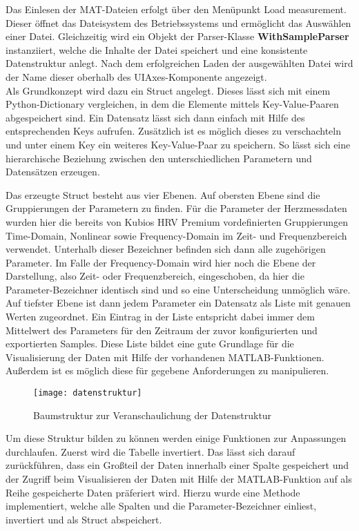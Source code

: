 Das Einlesen der MAT-Dateien erfolgt über den Menüpunkt \glqq Load measurement\grqq{}. Dieser öffnet das Dateisystem des Betriebssystems und ermöglicht das Auswählen einer Datei. Gleichzeitig wird ein Objekt der Parser-Klasse \textbf{WithSampleParser} instanziiert, welche die Inhalte der Datei speichert und eine konsistente Datenstruktur anlegt. Nach dem erfolgreichen Laden der ausgewählten Datei wird der Name dieser oberhalb des UIAxes-Komponente angezeigt.\\
Als Grundkonzept wird dazu ein Struct angelegt. Dieses lässt sich mit einem Python-Dictionary vergleichen, in dem die Elemente mittels Key-Value-Paaren abgespeichert sind. Ein Datensatz lässt sich dann einfach mit Hilfe des entsprechenden Keys aufrufen. Zusätzlich ist es möglich dieses zu verschachteln und unter einem Key ein weiteres Key-Value-Paar zu speichern. So lässt sich eine hierarchische Beziehung zwischen den unterschiedlichen Parametern und Datensätzen erzeugen.\cite{pythonDict}

Das erzeugte Struct besteht aus vier Ebenen. Auf obersten Ebene sind die Gruppierungen der Parametern zu finden. Für die Parameter der Herzmessdaten wurden hier die bereits von Kubios HRV Premium vordefinierten Gruppierungen Time-Domain, Nonlinear sowie Frequency-Domain im Zeit- und Frequenzbereich verwendet. Unterhalb dieser Bezeichner befinden sich dann alle zugehörigen Parameter. Im Falle der Frequency-Domain wird hier noch die Ebene der Darstellung, also Zeit- oder Frequenzbereich, eingeschoben, da hier die Parameter-Bezeichner identisch sind und so eine Unterscheidung unmöglich wäre. Auf tiefster Ebene ist dann jedem Parameter ein Datensatz als Liste mit genauen Werten zugeordnet. Ein Eintrag in der Liste entspricht dabei immer dem Mittelwert des Parameters für den Zeitraum der zuvor konfigurierten und exportierten Samples. Diese Liste bildet eine gute Grundlage für die Visualisierung der Daten mit Hilfe der vorhandenen MATLAB-Funktionen. Außerdem ist es möglich diese für gegebene Anforderungen zu manipulieren.

\begin{figure}[H]
	\centering
	\texttt{[image: datenstruktur]}
	\caption{Baumstruktur zur Veranschaulichung der Datenstruktur}
	\label{fig:datenstruktur}
\end{figure}

Um diese Struktur bilden zu können werden einige Funktionen zur Anpassungen durchlaufen. Zuerst wird die Tabelle invertiert. Das lässt sich darauf zurückführen, dass ein Großteil der Daten innerhalb einer Spalte gespeichert und der Zugriff beim Visualisieren der Daten mit Hilfe der MATLAB-Funktion auf als Reihe gespeicherte Daten präferiert wird. Hierzu wurde eine Methode implementiert, welche alle Spalten und die Parameter-Bezeichner einliest, invertiert und als Struct abspeichert.

